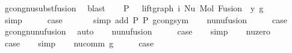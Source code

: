 \begin{isabellebody}
\ gcong{\isachardot}{\kern0pt}nu{\isacharunderscore}{\kern0pt}subst{\isacharunderscore}{\kern0pt}fusion{}\ \isamarkupfalse%
\ blast\isanewline
\ \ \isamarkupfalse%
\ P{}{\isacharcolon}{\kern0pt}\ {\isachardoublequoteopen}{\isachardot}{\kern0pt}{\isachardot}{\kern0pt}{\isachardot}{\kern0pt}\ {\isacharequal}{\kern0pt}\ lift{\isacharunderscore}{\kern0pt}graph\ i\ {\isacharparenleft}{\kern0pt}Nu\ {\isacharparenleft}{\kern0pt}Mol\ {\isacharparenleft}{\kern0pt}Fusion\ {}\ y{\isacharparenright}{\kern0pt}\ g{\isacharparenright}{\kern0pt}{\isacharparenright}{\kern0pt}{\isachardoublequoteclose}\isanewline
\ \ \ \ \ \isamarkupfalse%
\ simp\isanewline
\ \ \isamarkupfalse%
\ \isamarkupfalse%
\ {\isacharquery}{\kern0pt}case\isanewline
\ \ \ \ \ \isamarkupfalse%
\ {\isacharparenleft}{\kern0pt}simp\ add{\isacharcolon}{\kern0pt}\ P{}\ P{}\ gcong{\isachardot}{\kern0pt}sym{\isacharparenright}{\kern0pt}\isanewline
{}\isamarkupfalse%
\isanewline
\ \ \isamarkupfalse%
\ nu{\isacharunderscore}{\kern0pt}nu{\isacharunderscore}{\kern0pt}fusion{}\isanewline
\ \ \isamarkupfalse%
\ \isamarkupfalse%
\ {\isacharquery}{\kern0pt}case\isanewline
\ \ \isamarkupfalse%
\ gcong{\isachardot}{\kern0pt}nu{\isacharunderscore}{\kern0pt}nu{\isacharunderscore}{\kern0pt}fusion{}\ \isamarkupfalse%
\ auto\isanewline
{}\isamarkupfalse%
\isanewline
\ \ \isamarkupfalse%
\ nu{\isacharunderscore}{\kern0pt}nu{\isacharunderscore}{\kern0pt}fusion{}\isanewline
\ \ \isamarkupfalse%
\ \isamarkupfalse%
\ {\isacharquery}{\kern0pt}case\isanewline
\ \ \isamarkupfalse%
\ simp\isanewline
{}\isamarkupfalse%
\isanewline
\ \ \isamarkupfalse%
\ nu{\isacharunderscore}{\kern0pt}zero\isanewline
\ \ \isamarkupfalse%
\ \isamarkupfalse%
\ {\isacharquery}{\kern0pt}case\isanewline
\ \ \isamarkupfalse%
\ simp\isanewline
{}\isamarkupfalse%
\isanewline
\ \ \isamarkupfalse%
\ {\isacharparenleft}{\kern0pt}nu{\isacharunderscore}{\kern0pt}comm\ g{\isacharparenright}{\kern0pt}\isanewline
\ \ \isamarkupfalse%
\ \isamarkupfalse%
\ {\isacharquery}{\kern0pt}case\isanewline

\end{isabellebody}
